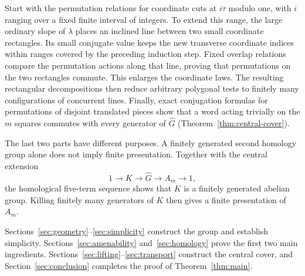 \begin{enumerate}[leftmargin=*,label=\textup{\arabic*.}]
Start with the permutation relations for coordinate cuts at
$i\tau$ modulo one, with $i$ ranging over a fixed finite interval
of integers. To extend this
range, the large ordinary slope of $\lambda$ places an inclined
line between two small coordinate rectangles. Its small conjugate
value keeps the new transverse coordinate indices within ranges covered
by the preceding induction step. Fixed overlap relations compare
the permutation actions along that line, proving that permutations
on the two rectangles commute. This enlarges the coordinate laws.
The resulting rectangular decompositions then reduce arbitrary
polygonal tests to finitely many configurations of concurrent lines.
Finally, exact conjugation formulas for permutations of disjoint
translated pieces show that a word acting trivially on the $m$ squares
commutes with every
generator of $\widehat G$ (Theorem~\ref{thm:central-cover}).
\end{enumerate}

The last two parts have different purposes. A finitely generated
second homology group alone does not imply finite presentation.
Together with the central extension
\[
 1\longrightarrow K\longrightarrow\widehat G
 \longrightarrow A_m\longrightarrow1,
\]
the homological five-term sequence shows that $K$ is a finitely
generated abelian group. Killing finitely many generators of $K$
then gives a finite presentation of $A_m$.

Sections~\ref{sec:geometry}--\ref{sec:simplicity} construct the group
and establish simplicity. Sections~\ref{sec:amenability}
and~\ref{sec:homology} prove the first two main ingredients.
Sections~\ref{sec:lifting}--\ref{sec:transport} construct the central
cover, and Section~\ref{sec:conclusion} completes the proof of
Theorem~\ref{thm:main}.
